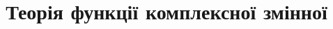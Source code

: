 \documentclass[a4paper,12pt, centered]{bookest}
\title{{Теорія функції комплексної змінної}\thispagestyle{empty}}
\begin{document}
\begin{justify}
	\maketitle
	\let\cleardoublepage\clearpage
	\tableofcontents
	\newpage
	
\end{justify}
\end{document}
